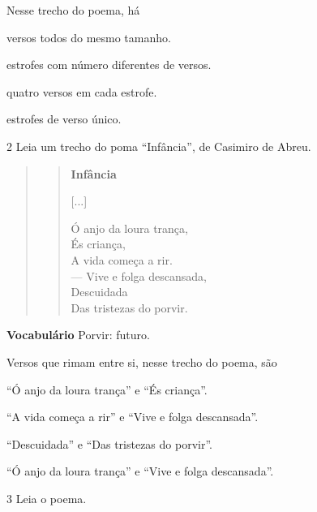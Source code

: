 Nesse trecho do poema, há

\begin{escolha}[itemsep=-5pt]
\item versos todos do mesmo tamanho.

\item estrofes com número diferentes de versos.

\item quatro versos em cada estrofe.

\item estrofes de verso único.
\end{escolha}

\num{2} Leia um trecho do poma ``Infância'', de Casimiro de Abreu.

\begin{quote}
\begin{verse}
\textbf{Infância}

{[}...{]}

Ó anjo da loura trança,\\
És criança,\\
A vida começa a rir.\\
--- Vive e folga descansada,\\
Descuidada\\
Das tristezas do porvir.
\end{verse}
\end{quote}


\textbf{Vocabulário}
Porvir: futuro.

Versos que rimam entre si, nesse trecho do poema, são

\begin{escolha}[itemsep=-5pt]
\item ``Ó anjo da loura trança'' e ``És criança''.

\item ``A vida começa a rir'' e ``Vive e folga descansada''.

\item ``Descuidada'' e ``Das tristezas do porvir''.

\item ``Ó anjo da loura trança'' e ``Vive e folga descansada''.
\end{escolha}

\num{3} Leia o poema.


